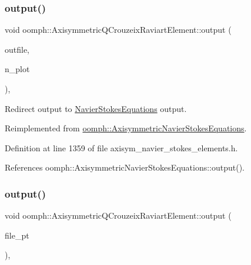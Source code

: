 \subsubsection{\texorpdfstring{output()}{output()}\hspace{0.1cm}{\footnotesize\ttfamily [2/4]}}
{\footnotesize\ttfamily void oomph\+::\+Axisymmetric\+Q\+Crouzeix\+Raviart\+Element\+::output (\begin{DoxyParamCaption}\item[{std\+::ostream \&}]{outfile,  }\item[{const unsigned \&}]{n\+\_\+plot }\end{DoxyParamCaption})\hspace{0.3cm}{\ttfamily [inline]}, {\ttfamily [virtual]}}



Redirect output to \hyperlink{classoomph_1_1NavierStokesEquations}{Navier\+Stokes\+Equations} output. 



Reimplemented from \hyperlink{classoomph_1_1AxisymmetricNavierStokesEquations_a94a243ca05ba3b995e366564e6cf7695}{oomph\+::\+Axisymmetric\+Navier\+Stokes\+Equations}.



Definition at line 1359 of file axisym\+\_\+navier\+\_\+stokes\+\_\+elements.\+h.



References oomph\+::\+Axisymmetric\+Navier\+Stokes\+Equations\+::output().

\mbox{\label{classoomph_1_1AxisymmetricQCrouzeixRaviartElement_a89e6624edb01f732c6c10b068227de54}} 
\subsubsection{\texorpdfstring{output()}{output()}\hspace{0.1cm}{\footnotesize\ttfamily [3/4]}}
{\footnotesize\ttfamily void oomph\+::\+Axisymmetric\+Q\+Crouzeix\+Raviart\+Element\+::output (\begin{DoxyParamCaption}\item[{F\+I\+LE $\ast$}]{file\+\_\+pt }\end{DoxyParamCaption})\hspace{0.3cm}{\ttfamily [inline]}, {\ttfamily [virtual]}}



